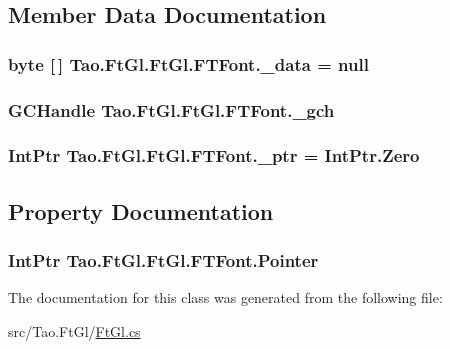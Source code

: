 \subsection{Member Data Documentation}
\hypertarget{class_tao_1_1_ft_gl_1_1_ft_gl_1_1_f_t_font_a264bf74df4541688591c0b7d4edf219c}{
\subsubsection[{\_\-data}]{\setlength{\rightskip}{0pt plus 5cm}byte \mbox{[}$\,$\mbox{]} {\bf Tao.FtGl.FtGl.FTFont.\_\-data} = null}}
\label{class_tao_1_1_ft_gl_1_1_ft_gl_1_1_f_t_font_a264bf74df4541688591c0b7d4edf219c}
\hypertarget{class_tao_1_1_ft_gl_1_1_ft_gl_1_1_f_t_font_afc3521c1424646b6df272c7eb62a50d3}{
\subsubsection[{\_\-gch}]{\setlength{\rightskip}{0pt plus 5cm}GCHandle {\bf Tao.FtGl.FtGl.FTFont.\_\-gch}}}
\label{class_tao_1_1_ft_gl_1_1_ft_gl_1_1_f_t_font_afc3521c1424646b6df272c7eb62a50d3}
\hypertarget{class_tao_1_1_ft_gl_1_1_ft_gl_1_1_f_t_font_ae90b1c2f0ad98e4af764da8afedbdcdc}{
\subsubsection[{\_\-ptr}]{\setlength{\rightskip}{0pt plus 5cm}IntPtr {\bf Tao.FtGl.FtGl.FTFont.\_\-ptr} = IntPtr.Zero}}
\label{class_tao_1_1_ft_gl_1_1_ft_gl_1_1_f_t_font_ae90b1c2f0ad98e4af764da8afedbdcdc}


\subsection{Property Documentation}
\hypertarget{class_tao_1_1_ft_gl_1_1_ft_gl_1_1_f_t_font_a0fe6dcd8dda1097cb79f22cb14f8caca}{
\subsubsection[{Pointer}]{\setlength{\rightskip}{0pt plus 5cm}IntPtr Tao.FtGl.FtGl.FTFont.Pointer}}
\label{class_tao_1_1_ft_gl_1_1_ft_gl_1_1_f_t_font_a0fe6dcd8dda1097cb79f22cb14f8caca}


The documentation for this class was generated from the following file:\begin{DoxyCompactItemize}
\item 
src/Tao.FtGl/\hyperlink{_ft_gl_8cs}{FtGl.cs}\end{DoxyCompactItemize}
